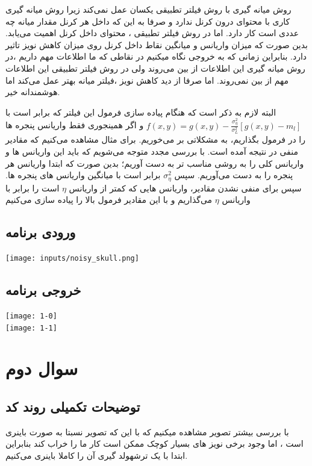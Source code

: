 \documentclass[12pt]{article}
\begin{document}
			روش میانه گیری با روش فیلتر تطبیقی یکسان عمل نمی‌کند زیرا روش میانه گیری کاری با محتوای درون کرنل ندارد و صرفا به این که داخل هر کرنل مقدار میانه چه عددی است کار دارد. اما در روش فیلتر تطبیقی ، محتوای داخل کرنل اهمیت می‌یابد. بدین صورت که میزان واریانس و میانگین نقاط داخل کرنل  روی میزان کاهش نویز تاثیر دارد. بنابراین زمانی که به خروجی نگاه میکنیم در نقاطی که ما اطلاعات مهم داریم ،در روش میانه گیری این اطلاعات از بین می‌روند ولی در روش فیلتر تطبیقی این اطلاعات مهم از بین نمی‌روند. اما صرفا از دید کاهش نویز ،فیلتر میانه بهتر عمل می‌کند اما هوشمندانه خیر.
			
			البته لازم به ذکر است که هنگام پیاده سازی فرمول این فیلتر که برابر است با 
$f(x,y) = g(x,y) - \frac{\sigma^2_\eta}{\sigma^2_L}[g(x,y) - m_l]$
و اگر همینجوری فقط واریانس پنجره ها را در فرمول بگذاریم، به مشکلاتی بر می‌خوریم. برای مثال مشاهده می‌کنیم که مقادیر منفی در نتیجه آمده است. با بررسی مجدد متوجه می‌شویم که باید این واریانس ها و واریانس کلی را به روشی مناسب تر به دست آوریم؛ بدین صورت که ابتدا واریانس هر پنجره را به دست می‌آوریم. سپس 
$\sigma^2_\eta$
برابر است با میانگین واریانس های پنجره ها. سپس برای منفی نشدن مقادیر، واریانس هایی که کمتر از واریانس $\eta$ است را برابر با واریانس $\eta$
می‌گذاریم و با این مقادیر فرمول بالا را پیاده سازی می‌کنیم

		\subsection{ورودی برنامه}
		\texttt{[image: inputs/noisy\_skull.png]}
		\subsection{خروجی برنامه}
		
		\texttt{[image: 1-0]}\\
		\texttt{[image: 1-1]}\\
		
		
		\newpage
		
		\section{سوال دوم }
		\subsection{توضیحات تکمیلی روند کد}
	با بررسی بیشتر تصویر مشاهده میکنیم که با این که تصویر نسبتا به صورت باینری است ، اما وجود برخی نویز های بسیار کوچک ممکن است کار ما را خراب کند بنابراین ابتدا با یک ترشهولد گیری آن را کاملا باینری می‌کنیم.
	
\end{document}
